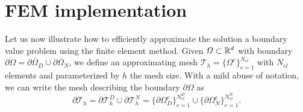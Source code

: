 \section{FEM implementation}\label{sec:finite-element-implementation}
Let us now illustrate how to efficiently approximate the solution a boundary value problem using the finite element method. Given $\Omega\subset \mathbb{R}^d$ with boundary $\overline{\partial \Omega} = \overline{\partial\Omega_D} \cup \overline{\partial\Omega_N}$, we define an approximating mesh  $\mathcal{T}_h = \{\Omega^e\}_{e=1}^{N_{el}}$ with $N_{el}$ elements and parameterized by $h$ the mesh size. With a mild abuse of notation, we can write the mesh describing the boundary $\partial\Omega$ as 
\begin{equation}
    \partial\mathcal{T}_h = \partial\mathcal{T}_h^D \cup\partial\mathcal{T}_h^N = \{\partial\Omega^e_D\}_{e=1}^{N_{el}^D} \cup \{\partial\Omega^e_N\}_{e=1}^{N_{el}^N}.
\end{equation}

